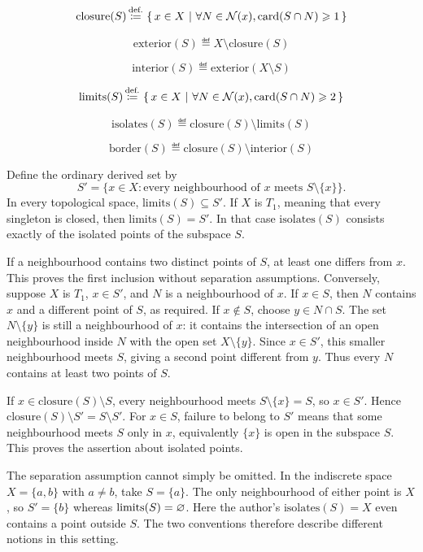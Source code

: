 \[
\text{closure}(S)\,{\stackrel{{\textrm{def.}}}{\coloneqq}}\,\left\{\,x\in X\ \middle|\ \forall N\in\mathcal{N}(x),{\text{card}}(S\cap N) \geqslant 1\,\right\}
\]

\[
\text{exterior}(S) \eqdef X\setminus \text{closure}(S)
\]

\[
\text{interior}(S) \eqdef \text{exterior}(X\setminus S)
\]

\[
\text{limits}(S)\,{\stackrel{{\textrm{def.}}}{\coloneqq}}\, \left\{\,x\in X\ \middle|\ \forall N\in\mathcal{N}(x),{\text{card}}(S\cap N) \geqslant 2\,\right\}
\]

\[
\text{isolates}(S) \eqdef \text{closure}(S)\setminus\text{limits}(S)
\]

\[
\text{border}(S) \eqdef \text{closure}(S)\setminus\text{interior}(S)
\]

\begin{proposition}
\label{prop:cardinality_limits_T1}
Define the ordinary derived set by
\[
S'=\{x\in X:\text{every neighbourhood of }x
                 \text{ meets }S\setminus\{x\}\}.
\]
In every topological space, $\text{limits}(S)\subseteq S'$.
If $X$ is $T_1$, meaning that every singleton is closed, then
$\text{limits}(S)=S'$. In that case $\text{isolates}(S)$ consists
exactly of the isolated points of the subspace $S$.
\end{proposition}
\Proof
If a neighbourhood contains two distinct points of $S$, at least one
differs from $x$. This proves the first inclusion without separation
assumptions. Conversely, suppose $X$ is $T_1$, $x\in S'$, and $N$
is a neighbourhood of $x$. If $x\in S$, then $N$ contains $x$ and
a different point of $S$, as required. If $x\notin S$, choose
$y\in N\cap S$. The set $N\setminus\{y\}$ is still a
neighbourhood of $x$: it contains the intersection of an open
neighbourhood inside $N$ with the open set $X\setminus\{y\}$.
Since $x\in S'$, this smaller neighbourhood meets $S$, giving a
second point different from $y$. Thus every $N$ contains at least
two points of $S$.

If $x\in\text{closure}(S)\setminus S$, every neighbourhood meets
$S\setminus\{x\}=S$, so $x\in S'$. Hence
$\text{closure}(S)\setminus S'=S\setminus S'$.
For $x\in S$, failure to belong to $S'$ means that some neighbourhood
meets $S$ only in $x$, equivalently $\{x\}$ is open in the subspace
$S$. This proves the assertion about isolated points.
\Done

The separation assumption cannot simply be omitted. In the indiscrete
space $X=\{a,b\}$ with $a\ne b$, take $S=\{a\}$. The only
neighbourhood of either point is $X$, so $S'=\{b\}$ whereas
$\text{limits}(S)=\varnothing$. Here the author's
$\text{isolates}(S)=X$ even contains a point outside $S$.
The two conventions therefore describe different notions in this setting.

